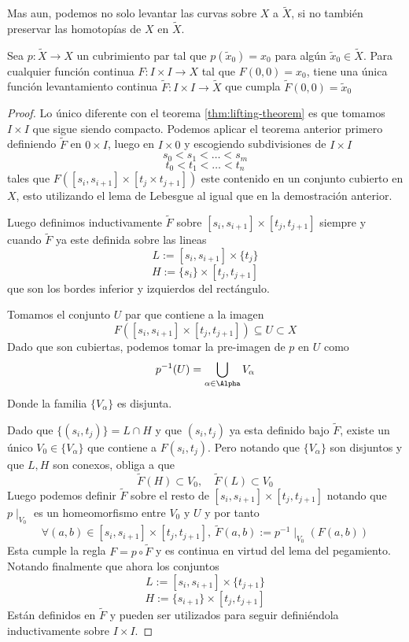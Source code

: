 Mas aun, podemos no solo levantar las curvas sobre \(X\) a \(\tilde X\),
si no también preservar las homotopías de \(X\) en \(\tilde X\).
\begin{corolario} \label{thm:levantamiento-homotopico}
  Sea \(p : \tilde X \to X\) un cubrimiento par tal que \(p(\tilde x _0)
  = x_0 \) para algún \(\tilde x _0 \in \tilde X\). Para cualquier
  función continua \(F : I \times I \to X\) tal que \(F(0,0) = x_0\), tiene una
  única función levantamiento continua \(\tilde F : I \times I \to
  \tilde X\) que cumpla \(\tilde F (0,0) = \tilde x_0\)
\end{corolario}
\begin{proof}
  Lo único diferente con el teorema \ref{thm:lifting-theorem} es que
  tomamos \(I \times I\) que sigue siendo compacto. Podemos aplicar el
  teorema anterior primero definiendo \(\tilde F\) en \(0 \times I\),
  luego en \(I \times 0\) y escogiendo subdivisiones de \(I \times I\)
  \[ s_0 < s_1 < \dotsc < s_m \]
  \[ t_0 < t_1 < \dotsc < t_n \]
  tales que \(F ([s_i , s_{i+1}] \times [t_j \times t_{j+1}])\) este
  contenido en un conjunto cubierto en \(X\), esto utilizando
  el lema de Lebesgue al igual que en la demostración anterior.

  Luego definimos inductivamente \(\tilde F\) sobre \([s_i, s_{i+1}]
  \times [t_j , t_{j+1}]\) siempre y cuando \(\tilde F\) ya este
  definida sobre las lineas
  \[ L := [s_i , s_{i+1}] \times \{t_j\}\]
  \[ H := \{s_i\} \times [t_j , t_{j+1}] \]
  que son los bordes inferior y izquierdos del rectángulo.

  Tomamos el conjunto \(U\) par que contiene a la imagen
  \[ F([s_i , s_{i+1}] \times [t_j , t_{j+1}]) \subseteq U \subset X \]
  Dado que son cubiertas, podemos tomar la pre-imagen de \(p\) en \(U\) como
  \[ p^{-1}(U) = \bigcup_{\alpha \in \Alpha} V_\alpha\]
  Donde la familia \(\{V_\alpha\}\) es disjunta.

  Dado que \( \{(s_i, t_j)\} = L \cap H\) y que \( (s_i , t_j) \) ya
  esta definido bajo \(\tilde F\), existe un único \(V_0 \in
  \{V_\alpha\}\) que contiene a \(F (s_i, t_j)\). Pero notando que
  \(\{V_\alpha\}\) son disjuntos y que \(L,H\) son conexos, obliga a que
  \[ \tilde F (H) \subset V_0, \quad \tilde F (L) \subset V_0 \]
  Luego podemos definir \(\tilde F\) sobre el resto de \([s_i,
    s_{i+1}] \times [t_j , t_{j+1}]\) notando que \(p \mid_{V_0}\) es
  un homeomorfismo entre \(V_0\) y \(U\) y por tanto
  \begin{equation}\label{eq:induc-homotopia}
  \forall (a,b) \in [s_i, s_{i+1}] \times [t_j , t_{j+1}],
    \ \tilde F (a,b) := p^{-1} \mid_{V_0} \left( F(a,b) \right)
  \end{equation}
  Esta cumple la regla \( F = p \circ \tilde F\) y es continua en virtud
  del lema del pegamiento. Notando finalmente que ahora los conjuntos
  \[ L := [s_i , s_{i+1}] \times \{t_{j+1}\}\]
  \[ H := \{s_{i+1}\} \times [t_j , t_{j+1}] \]
  Están definidos en \(\tilde F\) y pueden ser utilizados para seguir
  definiéndola inductivamente sobre \(I \times I\).
\end{proof}
